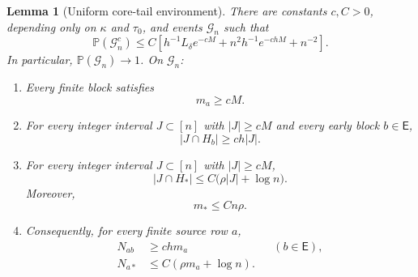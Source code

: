 \documentclass[11pt]{article}
\newcommand{\Pp}{\mathbb P}
\newcommand{\1}{\mathbf 1}
\newcommand{\cG}{\mathcal G}
\newtheorem{lemma}[theorem]{Lemma}
\theoremstyle{definition}
\theoremstyle{remark}
\begin{document}
\begin{lemma}[Uniform core-tail environment]
\label{lem:good-environment}
There are constants $c,C>0$, depending only on $\kappa$ and $\tau_0$, and
events $\cG_n$ such that
\begin{equation}\label{eq:environment-failure}
 \Pp(\cG_n^c)
 \le C\left[
 h^{-1}L_\delta e^{-cM}
 +n^2h^{-1}e^{-chM}
 +n^{-2}
 \right].
\end{equation}
In particular, $\Pp(\cG_n)\to1$.  On $\cG_n$:

\begin{enumerate}[label=\textnormal{(\roman*)}]
\item Every finite block satisfies
\begin{equation}\label{eq:finite-row-lower}
  m_a\geq cM.
\end{equation}

\item For every integer interval $J\subset[n]$ with $|J|\geq cM$ and
every early block $b\in\mathsf E$,
\begin{equation}\label{eq:early-interval-lower}
  |J\cap H_b|\geq c h|J|.
\end{equation}

\item For every integer interval $J\subset[n]$ with $|J|\geq cM$,
\begin{equation}\label{eq:tail-interval-upper}
  |J\cap H_*|\leq C\bigl(\rho|J|+\log n\bigr).
\end{equation}
Moreover,
\begin{equation}\label{eq:tail-total-upper}
  m_*\leq Cn\rho.
\end{equation}

\item Consequently, for every finite source row $a$,
\begin{align}
 N_{ab}&\geq chm_a &&(b\in\mathsf E),
 \label{eq:early-cell-lower}\\
 N_{a*}&\leq C(\rho m_a+\log n).
 \label{eq:tail-cell-upper}
\end{align}
\end{enumerate}
\end{lemma}
\end{document}
